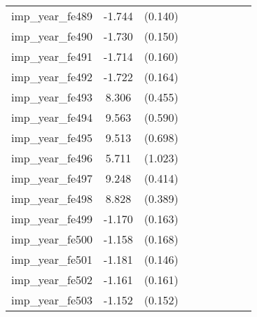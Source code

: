 {\begin{tabular}{l*{4}{cc}}
imp\_year\_fe489&   -1.744\sym{***}&  (0.140)&                  &         &                  &         &                  &         \\
imp\_year\_fe490&   -1.730\sym{***}&  (0.150)&                  &         &                  &         &                  &         \\
imp\_year\_fe491&   -1.714\sym{***}&  (0.160)&                  &         &                  &         &                  &         \\
imp\_year\_fe492&   -1.722\sym{***}&  (0.164)&                  &         &                  &         &                  &         \\
imp\_year\_fe493&    8.306\sym{***}&  (0.455)&                  &         &                  &         &                  &         \\
imp\_year\_fe494&    9.563\sym{***}&  (0.590)&                  &         &                  &         &                  &         \\
imp\_year\_fe495&    9.513\sym{***}&  (0.698)&                  &         &                  &         &                  &         \\
imp\_year\_fe496&    5.711\sym{***}&  (1.023)&                  &         &                  &         &                  &         \\
imp\_year\_fe497&    9.248\sym{***}&  (0.414)&                  &         &                  &         &                  &         \\
imp\_year\_fe498&    8.828\sym{***}&  (0.389)&                  &         &                  &         &                  &         \\
imp\_year\_fe499&   -1.170\sym{***}&  (0.163)&                  &         &                  &         &                  &         \\
imp\_year\_fe500&   -1.158\sym{***}&  (0.168)&                  &         &                  &         &                  &         \\
imp\_year\_fe501&   -1.181\sym{***}&  (0.146)&                  &         &                  &         &                  &         \\
imp\_year\_fe502&   -1.161\sym{***}&  (0.161)&                  &         &                  &         &                  &         \\
imp\_year\_fe503&   -1.152\sym{***}&  (0.152)&                  &         &                  &         &                  &         \\

\end{tabular}}
